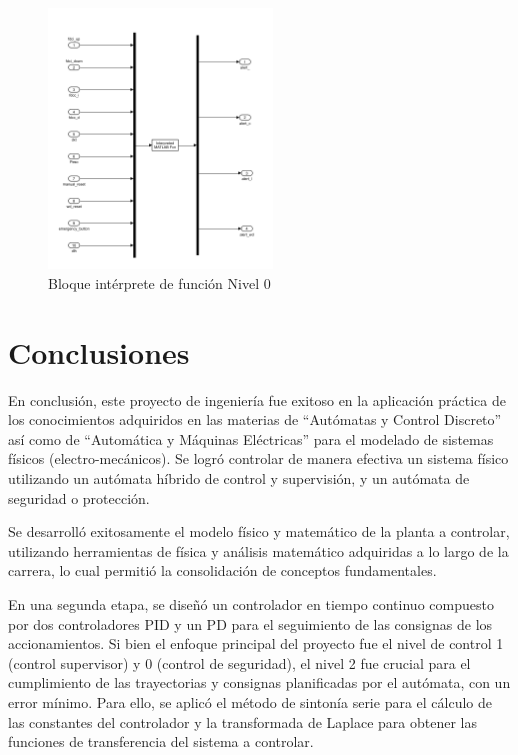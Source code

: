 \documentclass[11pt]{article}
\begin{document}
\begin{figure}[!h]
	\centering
	\includegraphics[width=0.53\textwidth]{images/codesys_matlab_nivel0.png}
	\caption{Bloque intérprete de función Nivel 0}
	\label{fig:bloque_interprete_funcion_nivel_0}
\end{figure}

\newpage

\section{Conclusiones}

En conclusión, este proyecto de ingeniería fue exitoso en la aplicación práctica de los conocimientos adquiridos en las materias de ``Autómatas y Control Discreto'' así como de ``Automática y Máquinas Eléctricas'' para el modelado de sistemas físicos (electro-mecánicos). Se logró controlar de manera efectiva un sistema físico utilizando un autómata híbrido de control y supervisión, y un autómata de seguridad o protección.

Se desarrolló exitosamente el modelo físico y matemático de la planta a controlar, utilizando herramientas de física y análisis matemático adquiridas a lo largo de la carrera, lo cual permitió la consolidación de conceptos fundamentales.

En una segunda etapa, se diseñó un controlador en tiempo continuo compuesto por dos controladores PID y un PD para el seguimiento de las consignas de los accionamientos. Si bien el enfoque principal del proyecto fue el nivel de control 1 (control supervisor) y 0 (control de seguridad), el nivel 2 fue crucial para el cumplimiento de las trayectorias y consignas planificadas por el autómata, con un error mínimo. Para ello, se aplicó el método de sintonía serie para el cálculo de las constantes del controlador y la transformada de Laplace para obtener las funciones de transferencia del sistema a controlar.
\end{document}
